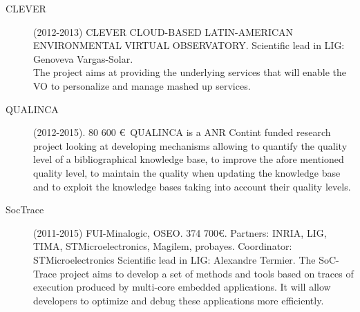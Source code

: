 \begin{description}
\item[CLEVER] (2012-2013)  CLEVER CLOUD-BASED LATIN-AMERICAN ENVIRONMENTAL VIRTUAL OBSERVATORY. Scientific lead in LIG: Genoveva Vargas-Solar. \\
The project aims at providing the underlying services that will enable the VO to personalize and manage mashed up services. 

\item[QUALINCA] (2012-2015). 80 600 \euro\ QUALINCA is a ANR Contint funded research project looking at developing mechanisms allowing to quantify the quality level of a bibliographical knowledge base, to improve the afore mentioned quality level, to maintain the quality when updating the knowledge base and to exploit the knowledge bases taking into account their quality levels. 

\item[ SocTrace] (2011-2015)  FUI-Minalogic, OSEO. 374 700\euro. Partners: INRIA, LIG, TIMA, STMicroelectronics, Magilem, probayes. Coordinator: STMicroelectronics
Scientific lead in LIG: Alexandre Termier.  The SoC-Trace project aims to develop a set of methods and tools based on traces of execution produced by multi-core embedded applications. It will allow developers to optimize and debug these applications more efficiently. 

\end{description}

